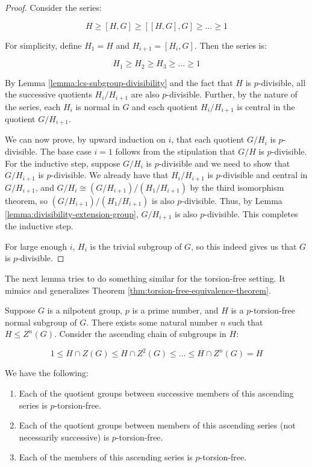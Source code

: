 \begin{proof}
  Consider the series:

  $$H \ge [H,G] \ge [[H,G],G] \ge \dots \ge 1$$

  For simplicity, define $H_1 = H$ and $H_{i+1} = [H_i,G]$. Then the series is:

  $$H_1 \ge H_2 \ge H_3 \ge \dots \ge 1$$

  By Lemma \ref{lemma:lcs-subgroup-divisibility} and the fact that $H$ is
  $p$-divisible, all the successive quotients $H_i/H_{i+1}$ are also
  $p$-divisible. Further, by the nature of the series, each $H_i$ is
  normal in $G$ and each quotient $H_i/H_{i+1}$ is central in the
  quotient $G/H_{i+1}$.

  We can now prove, by upward induction on $i$, that each quotient
  $G/H_i$ is $p$-divisible. The base case $i = 1$ follows from the
  stipulation that $G/H$ is $p$-divisible. For the inductive step,
  suppose $G/H_i$ is $p$-divisible and we need to show that
  $G/H_{i+1}$ is $p$-divisible. We already have that $H_i/H_{i+1}$ is
  $p$-divisible and central in $G/H_{i+1}$, and $G/H_i \cong
  (G/H_{i+1})/(H_1/H_{i+1})$ by the third isomorphism theorem, so $
  (G/H_{i+1})/(H_1/H_{i+1})$ is also $p$-divisible. Thus, by Lemma
  \ref{lemma:divisibility-extension-group}, $G/H_{i+1}$ is also
  $p$-divisible. This completes the inductive step.

  For large enough $i$, $H_i$ is the trivial subgroup of $G$, so this
  indeed gives us that $G$ is $p$-divisible.
\end{proof}

The next lemma tries to do something similar for the torsion-free
setting. It mimics and generalizes Theorem
\ref{thm:torsion-free-equivalence-theorem}.

\begin{lemma}\label{lemma:ucs-torsion-free-intersection}
  Suppose $G$ is a nilpotent group, $p$ is a prime number, and $H$ is
  a $p$-torsion-free normal subgroup of $G$. There exists some natural
  number $n$ such that $H \le Z^n(G)$. Consider the ascending chain of
  subgroups in $H$:

  $$1 \le H \cap Z(G) \le H \cap Z^2(G) \le \dots \le H \cap Z^n(G) = H$$

  We have the following:

  \begin{enumerate}
  \item Each of the quotient groups between successive members of this
    ascending series is $p$-torsion-free.
  \item Each of the quotient groups between members of this ascending
    series (not necessarily successive) is $p$-torsion-free.
  \item Each of the members of this ascending series is $p$-torsion-free.
  \end{enumerate}
\end{lemma}

